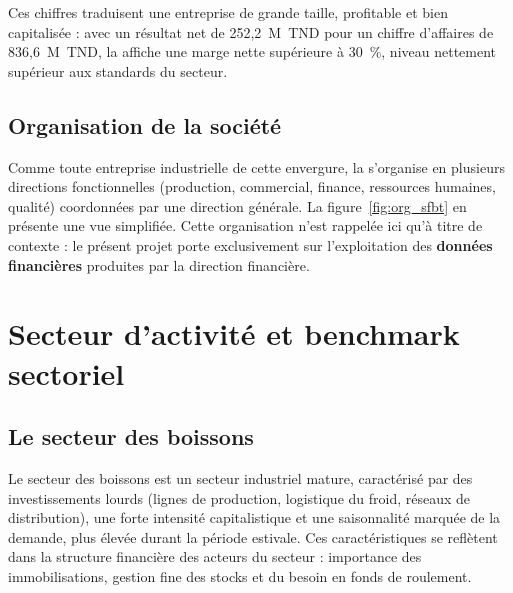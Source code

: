 \par Ces chiffres traduisent une entreprise de grande taille, profitable et bien
capitalisée : avec un résultat net de 252,2~M~TND pour un chiffre d'affaires de
836,6~M~TND, la \sfbt affiche une marge nette supérieure à 30~\%, niveau
nettement supérieur aux standards du secteur.

\subsection{Organisation de la société}
\par Comme toute entreprise industrielle de cette envergure, la \sfbt s'organise
en plusieurs directions fonctionnelles (production, commercial, finance,
ressources humaines, qualité) coordonnées par une direction générale. La
figure~\ref{fig:org_sfbt} en présente une vue simplifiée. Cette organisation
n'est rappelée ici qu'à titre de contexte : le présent projet porte exclusivement
sur l'exploitation des \textbf{données financières} produites par la direction
financière.


\section{Secteur d'activité et benchmark sectoriel}
\label{sec:secteur}

\subsection{Le secteur des boissons}
\par Le secteur des boissons est un secteur industriel mature, caractérisé par
des investissements lourds (lignes de production, logistique du froid, réseaux de
distribution), une forte intensité capitalistique et une saisonnalité marquée de
la demande, plus élevée durant la période estivale. Ces caractéristiques se
reflètent dans la structure financière des acteurs du secteur : importance des
immobilisations, gestion fine des stocks et du besoin en fonds de roulement.

